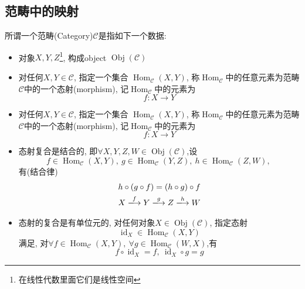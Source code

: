 
\subsection{范畴中的映射}

\begin{definition}
    所谓一个范畴(Category)$\mathcal{C}$是指如下一个数据:
    \begin{itemize}
        \item 对象$X,Y,Z$\footnote{在线性代数里面它们是线性空间}, 构成object $\operatorname{Obj}(\mathcal{C})$
        
        \item 对任何$X,Y \in \mathcal{C}$, 指定一个集合 $\operatorname{Hom}_{\mathcal{C}}(X,Y)$, 称$\operatorname{Hom}_{\mathcal{C}}$中的任意元素为范畴$\mathcal{C}$中的一个态射(morphism), 记$\operatorname{Hom}_{\mathcal{C}}$中的元素为
        \begin{equation}
          f\colon X\rightarrow Y
        \end{equation}

        \item 对任何$X,Y \in \mathcal{C}$, 指定一个集合 $\operatorname{Hom}_{\mathcal{C}}(X,Y)$, 称$\operatorname{Hom}_{\mathcal{C}}$中的任意元素为范畴$\mathcal{C}$中的一个态射(morphism), 记$\operatorname{Hom}_{\mathcal{C}}$中的元素为
        \begin{equation}
          f\colon X\rightarrow Y
        \end{equation}

        \item 态射复合是结合的, 即$\forall X,Y,Z,W \in \operatorname{Obj}(\mathcal{C})$,设
        \begin{equation}
          f \in \operatorname{Hom}_{\mathcal{C}}(X,Y), \ 
          g \in \operatorname{Hom}_{\mathcal{C}}(Y,Z), \ 
          h \in \operatorname{Hom}_{\mathcal{C}}(Z,W), \ 
        \end{equation}
        有(结合律)
        \begin{gather}
            h \circ (g \circ f) = (h\circ g) \circ f
            \\
            X \xlongrightarrow{f} Y \xlongrightarrow{g} Z \xlongrightarrow{h} W
        \end{gather}

        \item 态射的复合是有单位元的, 对任何对象$X \in \operatorname{Obj} (\mathcal{C})$, 指定态射
        \begin{equation}
          \operatorname{id}_{X} \in \operatorname{Hom}_{\mathcal{C}}(X,Y)
        \end{equation}
        满足, 对$\forall f \in \operatorname{Hom}_{\mathcal{C}} (X,Y) , \ \forall g \in \operatorname{Hom}_{\mathcal{C}}(W,X)$,有
        \begin{equation}
          f \circ \operatorname{id}_{X} = f , \ 
          \operatorname{id}_{X} \circ g = g
        \end{equation}
    \end{itemize}
\end{definition}

